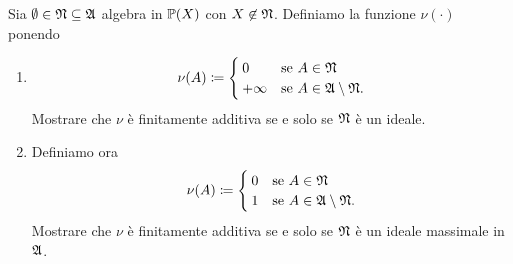 \documentclass[../EserciziIstituzioniAnalisi.tex]{subfiles}
\begin{document}
\begin{exercise}[13/10/2016]
  Sia $\emptyset \in \mathfrak N \subseteq \mathfrak A$ algebra in $\mathbb P(X)$ con $X \not\in \mathfrak N$. Definiamo la funzione $\nu(\cdot)$ ponendo
  \begin{enumerate}
    \item 
    \begin{equation*}
      \nu(A) \coloneqq
      \begin{cases}
        0 & \text{se $A \in \mathfrak N$}\\
        +\infty & \text{se $A \in \mathfrak A\setminus \mathfrak N$}.
      \end{cases}
    \end{equation*}
    Mostrare che $\nu$ è finitamente additiva se e solo se $\mathfrak N$ è un ideale. 
    \item Definiamo ora
    \begin{equation*}
      \nu(A) \coloneqq
      \begin{cases}
        0 & \text{se $A \in \mathfrak N$}\\
        1 & \text{se $A \in \mathfrak A\setminus \mathfrak N$}.
      \end{cases}
    \end{equation*}
    Mostrare che $\nu$ è finitamente additiva se e solo se $\mathfrak N$ è un ideale massimale in $\mathfrak A$.
  \end{enumerate}
\end{exercise}
\end{document}
